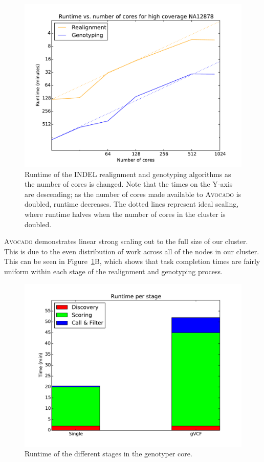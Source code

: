 \documentclass{bioinfo}
\begin{document}
\begin{figure}[h]
\begin{center}
\includegraphics[width=0.95\linewidth]{graphs/speedup.pdf}
\end{center}
\caption{Runtime of the INDEL realignment and genotyping algorithms as the
number of cores is changed. Note that the times on the Y-axis are descending; as
the number of cores made available to \textsc{Avocado} is doubled, runtime
decreases. The dotted lines represent ideal scaling, where runtime halves when
the number of cores in the cluster is doubled.}
\label{fig:speedup}
\end{figure}

\textsc{Avocado} demonstrates linear strong scaling out to the full size of our
cluster. This is due to the even distribution of work across all of the nodes in
our cluster. This can be seen in Figure~\ref{fig:speedup}B, which shows that
task completion times are fairly uniform within each stage of the realignment
and genotyping process.

\begin{figure}[h]
\begin{center}
\includegraphics[width=0.95\linewidth]{graphs/perf.pdf}
\end{center}
\caption{Runtime of the different stages in the genotyper core.}
\label{fig:genotyper-perf}
\end{figure}
\end{document}
